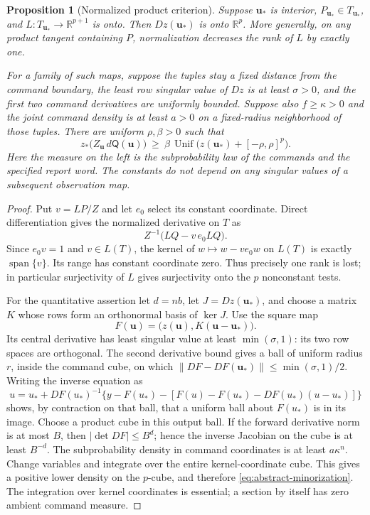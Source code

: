 \documentclass[11pt]{amsart}
\newtheorem{proposition}[theorem]{Proposition}
\theoremstyle{definition}\newtheorem{definition}[theorem]{Definition}
\theoremstyle{remark}\newtheorem{remark}[theorem]{Remark}
\newcommand{\R}{\mathbb R}\newcommand{\N}{\mathbb N}\newcommand{\C}{\mathbb C}
\begin{document}
\begin{proposition}[Normalized product criterion]\label{prop:product-criterion}
Suppose $\boldsymbol u_*$ is interior, $P_{\boldsymbol u_*}\in
T_{\boldsymbol u_*}$, and $L:T_{\boldsymbol u_*}\to\R^{p+1}$ is
onto. Then $Dz(\boldsymbol u_*)$ is onto $\R^p$. More generally, on
any product tangent containing $P$, normalization decreases the rank of
$L$ by exactly one.

For a family of such maps, suppose the tuples stay a fixed distance from
the command boundary, the least row singular value of $Dz$ is at least
$\sigma>0$, and the first two command derivatives are uniformly bounded.
Suppose also $f\ge\kappa>0$ and the joint command density is at least
$a>0$ on a fixed-radius neighborhood of those tuples. There are uniform $\rho,\beta>0$ such that
\begin{equation}\label{eq:abstract-minorization}
 z_*\bigl(Z_{\boldsymbol u}\,d\mathsf Q(\boldsymbol u)\bigr)
 \ \ge\ \beta\,\operatorname{Unif}
       \bigl(z(\boldsymbol u_*)+[-\rho,\rho]^p\bigr).
\end{equation}
Here the measure on the left is the subprobability law of the commands
and the specified report word. The constants do not depend on any
singular values of a subsequent observation map.
\end{proposition}
\begin{proof}
Put $v=LP/Z$ and let $e_0$ select its constant coordinate. Direct
differentiation gives the normalized derivative on $T$ as
\[
 Z^{-1}\bigl(LQ-v\,e_0LQ\bigr).
\]
Since $e_0v=1$ and $v\in L(T)$, the kernel of $w\mapsto w-v e_0w$
on $L(T)$ is exactly $\operatorname{span}\{v\}$. Its range has
constant coordinate zero. Thus precisely one rank is lost; in particular
surjectivity of $L$ gives surjectivity onto the $p$ nonconstant tests.

For the quantitative assertion let $d=nb$, let $J=Dz(\boldsymbol u_*)$,
and choose a matrix $K$ whose rows form an orthonormal basis of $\ker J$.
Use the square map
\[
 F(\boldsymbol u)=\bigl(z(\boldsymbol u),
               K(\boldsymbol u-\boldsymbol u_*)\bigr).
\]
Its central derivative has least singular value at least
$\min(\sigma,1)$: its two row spaces are orthogonal. The second
 derivative bound gives a ball of uniform radius $r$, inside the command
cube, on which
$\|DF-DF(\boldsymbol u_*)\|\le\min(\sigma,1)/2$.
Writing the inverse equation as
\[
 u=u_*+DF(u_*)^{-1}\{y-F(u_*)-[F(u)-F(u_*)-DF(u_*)(u-u_*)]\}
\]
shows, by contraction on that ball, that a uniform ball about $F(u_*)$
is in its image. Choose a product cube in this output ball. If the forward
 derivative norm is at most $B$, then $|\det DF|\le B^d$; hence the
inverse Jacobian on the cube is at least $B^{-d}$. The subprobability
density in command coordinates is at least $a\kappa^n$. Change variables
and integrate over the entire kernel-coordinate cube. This gives a
positive lower density on the $p$-cube, and therefore
\eqref{eq:abstract-minorization}. The integration over kernel coordinates
is essential; a section by itself has zero ambient command measure.
\end{proof}
\end{document}
